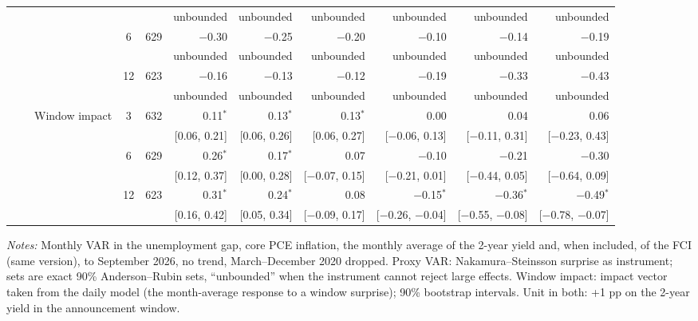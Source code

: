 \begin{longtable}{lllcrrrrrrr}
 & & & & & {\tiny unbounded} & {\tiny unbounded} & {\tiny unbounded} & {\tiny unbounded} & {\tiny unbounded} & {\tiny unbounded}\\
 &  &  & 6 & 629 & $-$0.30 & $-$0.25 & $-$0.20 & $-$0.10 & $-$0.14 & $-$0.19\\
 & & & & & {\tiny unbounded} & {\tiny unbounded} & {\tiny unbounded} & {\tiny unbounded} & {\tiny unbounded} & {\tiny unbounded}\\
 &  &  & 12 & 623 & $-$0.16 & $-$0.13 & $-$0.12 & $-$0.19 & $-$0.33 & $-$0.43\\
 & & & & & {\tiny unbounded} & {\tiny unbounded} & {\tiny unbounded} & {\tiny unbounded} & {\tiny unbounded} & {\tiny unbounded}\\
 &  & Window impact & 3 & 632 & 0.11$^{*}$ & 0.13$^{*}$ & 0.13$^{*}$ & 0.00 & 0.04 & 0.06\\
 & & & & & {\tiny [0.06, 0.21]} & {\tiny [0.06, 0.26]} & {\tiny [0.06, 0.27]} & {\tiny [$-$0.06, 0.13]} & {\tiny [$-$0.11, 0.31]} & {\tiny [$-$0.23, 0.43]}\\
 &  &  & 6 & 629 & 0.26$^{*}$ & 0.17$^{*}$ & 0.07 & $-$0.10 & $-$0.21 & $-$0.30\\
 & & & & & {\tiny [0.12, 0.37]} & {\tiny [0.00, 0.28]} & {\tiny [$-$0.07, 0.15]} & {\tiny [$-$0.21, 0.01]} & {\tiny [$-$0.44, 0.05]} & {\tiny [$-$0.64, 0.09]}\\
 &  &  & 12 & 623 & 0.31$^{*}$ & 0.24$^{*}$ & 0.08 & $-$0.15$^{*}$ & $-$0.36$^{*}$ & $-$0.49$^{*}$\\
 & & & & & {\tiny [0.16, 0.42]} & {\tiny [0.05, 0.34]} & {\tiny [$-$0.09, 0.17]} & {\tiny [$-$0.26, $-$0.04]} & {\tiny [$-$0.55, $-$0.08]} & {\tiny [$-$0.78, $-$0.07]}\\
\end{longtable}
\begin{flushleft}\footnotesize\textit{Notes:} Monthly VAR in the unemployment gap, core PCE inflation, the monthly average of the 2-year yield and, when included, of the FCI (same version), to September 2026, no trend, March--December 2020 dropped. Proxy VAR: Nakamura--Steinsson surprise as instrument; sets are exact 90\% Anderson--Rubin sets, ``unbounded'' when the instrument cannot reject large effects. Window impact: impact vector taken from the daily model (the month-average response to a window surprise); 90\% bootstrap intervals. Unit in both: +1 pp on the 2-year yield in the announcement window.\end{flushleft}
\endgroup
